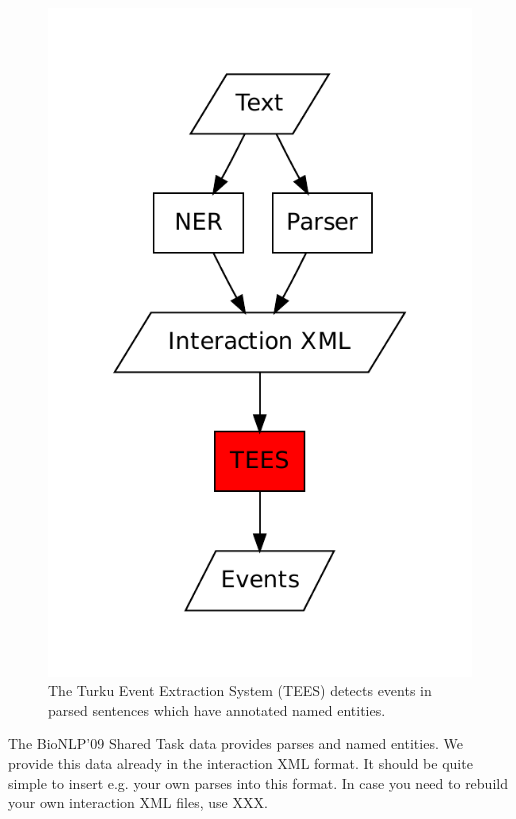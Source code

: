 \documentclass[a4paper,12pt]{article}
\begin{document}
\begin{figure}[h]
\begin{center}
\includegraphics[scale=0.5]{Figures/overview.pdf}
\end{center}
\caption{The Turku Event Extraction System (TEES) detects events
in parsed sentences which have annotated named entities.}
\label{fig-overview}
\end{figure}

The BioNLP'09 Shared Task data provides parses and named entities. We provide
this data already in the interaction XML format. It should be quite simple to
insert e.g. your own parses into this format. In case you need to rebuild your
own interaction XML files, use XXX.
\end{document}
